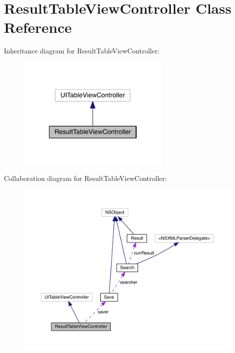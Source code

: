\section{Result\+Table\+View\+Controller Class Reference}
\label{interface_result_table_view_controller}


Inheritance diagram for Result\+Table\+View\+Controller\+:
\nopagebreak
\begin{figure}[H]
\begin{center}
\leavevmode
\includegraphics[width=212pt]{interface_result_table_view_controller__inherit__graph}
\end{center}
\end{figure}


Collaboration diagram for Result\+Table\+View\+Controller\+:
\nopagebreak
\begin{figure}[H]
\begin{center}
\leavevmode
\includegraphics[width=350pt]{interface_result_table_view_controller__coll__graph}
\end{center}
\end{figure}
